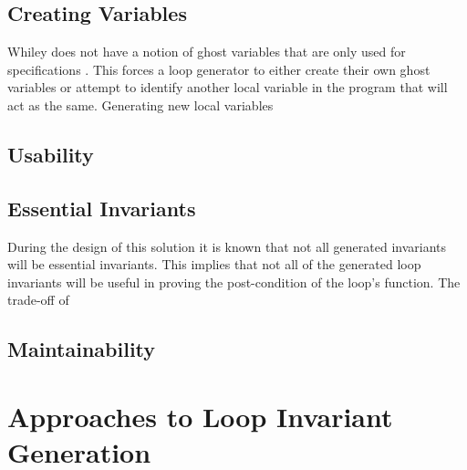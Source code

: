 \subsection{Creating Variables}
%

Whiley does not have a notion of ghost variables that are only used for
specifications \cite{whiley-origin}.
This forces a loop generator to either create their own ghost variables or
attempt to identify another local variable in the program that will act as the
same.
Generating new local variables 

\subsection{Usability}

\subsection{Essential Invariants}

During the design of this solution it is known that not all generated
invariants will be essential invariants.
This implies that not all of the generated loop invariants will be useful
in proving the post-condition of the loop's function.
The trade-off of 

\subsection{Maintainability}


\section{Approaches to Loop Invariant Generation}


